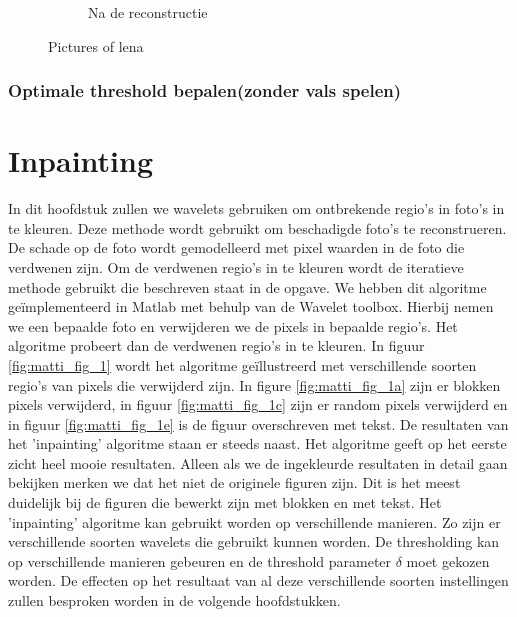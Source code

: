 \begin{figure}
\begin{subfigure}[b]{0.45\textwidth}
        \caption{Na de reconstructie}
        \label{fig:mouse}
    \end{subfigure}
    \caption{Pictures of lena}\label{fig:optimaleRuisBIOR}
\end{figure}


\subsubsection{Optimale threshold bepalen(zonder vals spelen)}




\section{Inpainting}

In dit hoofdstuk zullen we wavelets gebruiken om ontbrekende regio's in foto's in te kleuren. Deze methode wordt gebruikt om beschadigde foto's te reconstrueren. De schade op de foto wordt gemodelleerd met pixel waarden in de foto die verdwenen zijn. Om de verdwenen regio's in te kleuren wordt de iteratieve methode gebruikt die beschreven staat in de opgave. We hebben dit algoritme ge\"{i}mplementeerd in Matlab met behulp van de Wavelet toolbox. Hierbij nemen we een bepaalde foto en verwijderen we de pixels in bepaalde regio's. Het algoritme probeert dan de verdwenen regio's in te kleuren. 
\newline
\newline
In figuur \ref{fig:matti_fig_1} wordt het algoritme ge\"{i}llustreerd met verschillende soorten regio's van pixels die verwijderd zijn. In figure \ref{fig:matti_fig_1a} zijn er blokken pixels verwijderd, in figuur \ref{fig:matti_fig_1c} zijn er random pixels verwijderd en in figuur \ref{fig:matti_fig_1e} is de figuur overschreven met tekst. De resultaten van het 'inpainting' algoritme staan er steeds naast. Het algoritme geeft op het eerste zicht heel mooie resultaten. Alleen als we de ingekleurde resultaten in detail gaan bekijken merken we dat het niet de originele figuren zijn. Dit is het meest duidelijk bij de figuren die bewerkt zijn met blokken en met tekst.
\newline
\newline
Het 'inpainting' algoritme kan gebruikt worden op verschillende manieren. Zo zijn er verschillende soorten wavelets die gebruikt kunnen worden. De thresholding kan op verschillende manieren gebeuren en de threshold parameter $\delta$ moet gekozen worden. De effecten op het resultaat van al deze verschillende soorten instellingen zullen besproken worden in de volgende hoofdstukken.

